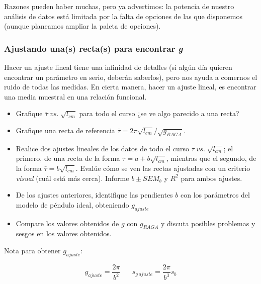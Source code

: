 \documentclass[10pt,a4paper]{article}
\numberwithin{equation}{section}%
\numberwithin{equation}{subsection}
\begin{document}
Razones pueden haber muchas, pero ya advertimos: la potencia de nuestro análisis de datos está limitada por la falta de opciones de las que disponemos (aunque planeamos ampliar la paleta de opciones). 



\subsubsection*{Ajustando una(s) recta(s) para encontrar \textit{g}}

Hacer un ajuste lineal tiene una infinidad de detalles (si algún día quieren encontrar un parámetro en serio, deberán saberlos), pero nos ayuda a comernos el ruido de todas las medidas. En cierta manera, hacer un ajuste lineal, es encontrar una media muestral en una relación funcional.



\begin{itemize}
\item[\textbf{a)}] Grafique $\overline{\tau} \; vs. \; \sqrt{l_{cm}}$ para todo el curso ¿se ve algo parecido a una recta?
\item[\textbf{b}] Grafique una recta de referencia $\overline{\tau} = 2 \pi \sqrt{l_{cm}} /\sqrt{g_{RAGA}}$.   
\item[\textbf{c)}] Realice dos ajustes lineales de los datos de todo el curso $\bar{\tau} \; vs. \; \sqrt{l_{cm}}$; el primero, de una recta de la forma $\bar{\tau} = a + b \sqrt{l_{cm}}$, mientras que el segundo, de la forma $\bar{\tau} = b \sqrt{l_{cm}}$. Evalúe cómo se ven las rectas ajustadas con un criterio \textit{visual} (cuál está más cerca). Informe $b \pm SEM_b$ y $R^2$ para ambos ajustes.
\item[g)] De los ajustes anteriores, identifique las pendientes $b$ con los parámetros del modelo de péndulo ideal, obteniendo $g_{ajuste}$
\item[h)] Compare los valores obtenidos de $g$ con $g_{RAGA}$ y discuta posibles problemas y sesgos en los valores obtenidos.
\end{itemize}

\begin{small}
Nota para obtener $g_{ajuste}$:
\end{small}

$$
g_{ajuste} = \frac{2 \pi}{b^2} \;\;\;\;\;\; s_{g\,ajuste} = \frac{2\pi}{b^3} s_b 
$$
\end{document}
